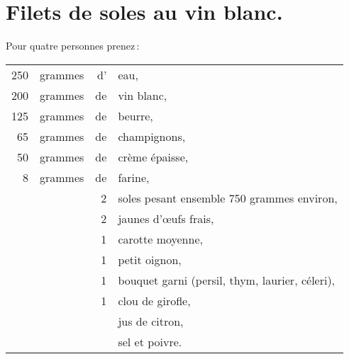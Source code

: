 \section*{\centering Filets de soles au vin blanc.}
\label{pg0363} \hypertarget{p0363}{}

Pour quatre personnes prenez :

\medskip

\footnotesize
\begin{longtable}{rrrp{16em}}
    250 & grammes & d' & eau,                                                                             \\
    200 & grammes & de & vin blanc,                                                                       \\
    125 & grammes & de & beurre,                                                                          \\
     65 & grammes & de & champignons,                                                                     \\
     50 & grammes & de & crème épaisse,                                                                   \\
      8 & grammes & de & farine,                                                                          \\
        &         &  2 & soles pesant ensemble 750 grammes environ,                                       \\
        &         &  2 & jaunes d'œufs frais,                                                             \\
        &         &  1 & carotte moyenne,                                                                 \\
        &         &  1 & petit oignon,                                                                    \\
        &         &  1 & bouquet garni (persil, thym, laurier, céleri),                                   \\
        &         &  1 & clou de girofle,                                                                 \\
        &         &    & jus de citron,                                                                   \\
        &         &    & sel et poivre.                                                                   \\
\end{longtable}
\normalsize

